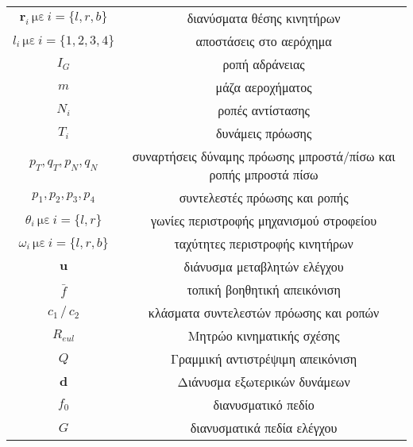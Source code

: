 \begin{center}
\begin{tabular}{ c c }
        $ \bm{r}_{i}\,\text{με}\,i = \{l, r, b\}$        & διανύσματα θέσης κινητήρων                                      \\
        $ l_{i} \,\text{με}\,i = \{1, 2, 3, 4\}$         & αποστάσεις στο αερόχημα                                         \\
        $ I_{G} $                                        & ροπή αδράνειας                                                  \\
        $ m $                                            & μάζα αεροχήματος                                                \\
        $ N_{i} $                                        & ροπές αντίστασης                                                \\
        $ T_{i} $                                        & δυνάμεις πρόωσης                                                \\
        $ p_{T}, q_{T}, p_{N}, q_{N} $                   & συναρτήσεις δύναμης πρόωσης μπροστά/πίσω και ροπής μπροστά πίσω \\
        $ p_{1}, p_{2}, p_{3}, p_{4} $                   & συντελεστές πρόωσης και ροπής                                   \\
        $ \theta_{i} \,\text{με}\,i = \{l, r\}$          & γωνίες περιστροφής μηχανισμού στροφείου                         \\
        $ \omega_{i} \,\text{με}\,i = \{l, r, b\}$       & ταχύτητες περιστροφής κινητήρων                                 \\
        $ \bm{u} $                                       & διάνυσμα μεταβλητών ελέγχου                                     \\
        $ \bar{f} $                                      & τοπική βοηθητική απεικόνιση                                     \\
        $ c_1 \, / \, c_2 $                              & κλάσματα συντελεστών πρόωσης και ροπών                          \\
        $ R_{eul}$                                       & Μητρώο κινηματικής σχέσης                                       \\
        $ Q $                                            & Γραμμική αντιστρέψιμη απεικόνιση                                \\
        $ \bm{d} $                                       & Διάνυσμα εξωτερικών δυνάμεων                                    \\
        $ f_0 $                                          & διανυσματικό πεδίο                                              \\
        $ G $                                            & διανυσματικά πεδία ελέγχου                                      \\

        \hline
    \end{tabular}
\end{center}